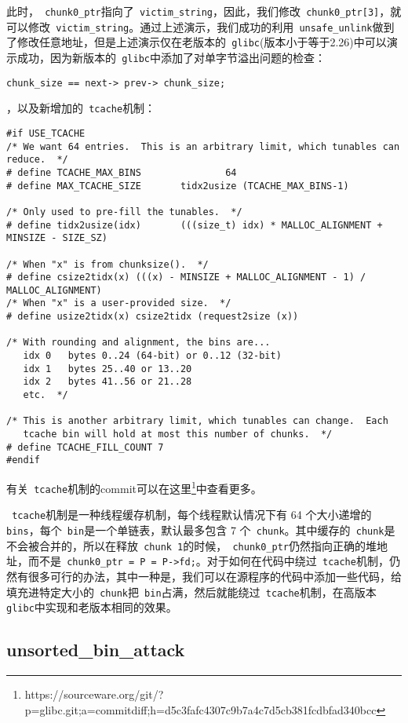 此时，\verb+ chunk0_ptr+指向了\verb+ victim_string+，因此，我们修改\verb+ chunk0_ptr[3]+，就可以修改\verb+ victim_string+。通过上述演示，我们成功的利用\verb+ unsafe_unlink+做到了修改任意地址，但是上述演示仅在老版本的\verb+ glibc+(版本小于等于2.26)中可以演示成功，因为新版本的\verb+ glibc+中添加了对单字节溢出问题的检查：
\begin{verbatim}
chunk_size == next-> prev-> chunk_size;
\end{verbatim}
，以及新增加的\verb+ tcache+机制：
\begin{verbatim}
#if USE_TCACHE
/* We want 64 entries.  This is an arbitrary limit, which tunables can reduce.  */
# define TCACHE_MAX_BINS               64
# define MAX_TCACHE_SIZE       tidx2usize (TCACHE_MAX_BINS-1)

/* Only used to pre-fill the tunables.  */
# define tidx2usize(idx)       (((size_t) idx) * MALLOC_ALIGNMENT + MINSIZE - SIZE_SZ)

/* When "x" is from chunksize().  */
# define csize2tidx(x) (((x) - MINSIZE + MALLOC_ALIGNMENT - 1) / MALLOC_ALIGNMENT)
/* When "x" is a user-provided size.  */
# define usize2tidx(x) csize2tidx (request2size (x))

/* With rounding and alignment, the bins are...
   idx 0   bytes 0..24 (64-bit) or 0..12 (32-bit)
   idx 1   bytes 25..40 or 13..20
   idx 2   bytes 41..56 or 21..28
   etc.  */

/* This is another arbitrary limit, which tunables can change.  Each
   tcache bin will hold at most this number of chunks.  */
# define TCACHE_FILL_COUNT 7
#endif
\end{verbatim}

有关\verb+ tcache+机制的commit可以在这里\footnote{https://sourceware.org/git/?p=glibc.git;a=commitdiff;h=d5c3fafc4307c9b7a4c7d5cb381fcdbfad340bcc}中查看更多。

\verb+ tcache+机制是一种线程缓存机制，每个线程默认情况下有 64 个大小递增的\verb+ bins+，每个\verb+ bin+是一个单链表，默认最多包含 7 个\verb+ chunk+。其中缓存的\verb+ chunk+是不会被合并的，所以在释放\verb+ chunk 1+的时候，\verb+ chunk0_ptr+仍然指向正确的堆地址，而不是\verb+ chunk0_ptr = P = P->fd;+。对于如何在代码中绕过\verb+ tcache+机制，仍然有很多可行的办法，其中一种是，我们可以在源程序的代码中添加一些代码，给填充进特定大小的\verb+ chunk+把\verb+ bin+占满，然后就能绕过\verb+ tcache+机制，在高版本\verb+ glibc+中实现和老版本相同的效果。

\subsection{unsorted\_bin\_attack}

